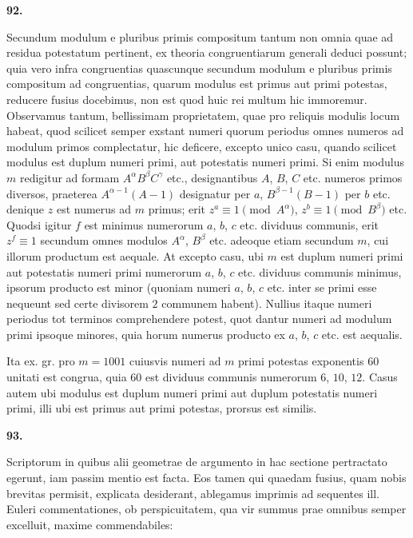 \documentclass[12pt,a4paper]{article}
\theoremstyle{plain}
\theoremstyle{definition}
\theoremstyle{remark}
\begin{document}
\setcounter{satz}{92}
\addtocounter{satz}{-1}
\textbf{92.}

Secundum modulum e pluribus primis compositum tantum non omnia quae ad residua potestatum pertinent, ex theoria congruentiarum generali deduci possunt; quia vero infra congruentias quascunque secundum modulum e pluribus primis compositum ad congruentias, quarum modulus est primus aut primi potestas, reducere fusius docebimus, non est quod huic rei multum hic immoremur. Observamus tantum, bellissimam proprietatem, quae pro reliquis modulis locum habeat, quod scilicet semper exstant numeri quorum periodus omnes numeros ad modulum primos complectatur, hic deficere, excepto unico casu, quando scilicet modulus est duplum numeri primi, aut potestatis numeri primi. Si enim modulus $m$ redigitur ad formam $A^\alpha B^\beta C^\gamma$ etc., designantibus $A$, $B$, $C$ etc. numeros primos diversos, praeterea $A^{\alpha-1}(A-1)$ designatur per $a$, $B^{\beta-1}(B-1)$ per $b$ etc. denique $z$ est numerus ad $m$ primus; erit $z^a \equiv 1 \pmod{A^\alpha}$, $z^b \equiv 1 \pmod{B^\beta}$ etc. Quodsi igitur $f$ est minimus numerorum $a$, $b$, $c$ etc. dividuus communis, erit $z^f \equiv 1$ secundum omnes modulos $A^\alpha$, $B^\beta$ etc. adeoque etiam secundum $m$, cui illorum productum est aequale. At excepto casu, ubi $m$ est duplum numeri primi aut potestatis numeri primi numerorum $a$, $b$, $c$ etc. dividuus communis minimus, ipsorum producto est minor (quoniam numeri $a$, $b$, $c$ etc. inter se primi esse nequeunt sed certe divisorem $2$ communem habent). Nullius itaque numeri periodus tot terminos comprehendere potest, quot dantur numeri ad modulum primi ipsoque minores, quia horum numerus producto ex $a$, $b$, $c$ etc. est aequalis.

Ita ex. gr. pro $m=1001$ cuiusvis numeri ad $m$ primi potestas exponentis $60$ unitati est congrua, quia $60$ est dividuus communis numerorum $6$, $10$, $12$. Casus autem ubi modulus est duplum numeri primi aut duplum potestatis numeri primi, illi ubi est primus aut primi potestas, prorsus est similis.

\setcounter{satz}{93}
\addtocounter{satz}{-1}
\textbf{93.}

Scriptorum in quibus alii geometrae de argumento in hac sectione pertractato egerunt, iam passim mentio est facta. Eos tamen qui quaedam fusius, quam nobis brevitas permisit, explicata desiderant, ablegamus imprimis ad sequentes ill. Euleri commentationes, ob perspicuitatem, qua vir summus prae omnibus semper excelluit, maxime commendabiles:
\end{document}
